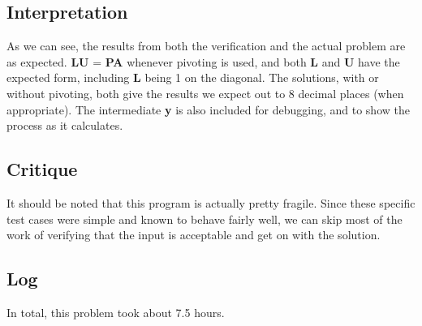 \documentclass[10pt,letter]{article}
\begin{document}
\subsection{Interpretation}

As we can see, the results from both the verification and the actual problem are as expected. \textbf{LU} = \textbf{PA} whenever pivoting is used, and both \textbf{L} and \textbf{U} have the expected form, including \textbf{L} being 1 on the diagonal. The solutions, with or without pivoting, both give the results we expect out to 8 decimal places (when appropriate). The intermediate \textbf{y} is also included for debugging, and to show the process as it calculates.

\subsection{Critique}

It should be noted that this program is actually pretty fragile. Since these specific test cases were simple and known to behave fairly well, we can skip most of the work of verifying that the input is acceptable and get on with the solution.

\subsection{Log}

In total, this problem took about 7.5 hours.
\end{document}
